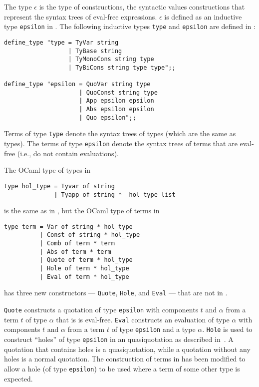 \documentclass[fleqn]{llncs}
\begin{document}
The {\churchqe} type $\epsilon$ is the type of constructions, the
syntactic values constructions that represent the syntax trees of
eval-free expressions.  $\epsilon$ is defined as an inductive type
\texttt{epsilon} in {\HLQE}.  The following inductive types
\texttt{type} and \texttt{epsilon} are defined in {\HLQE}:

\begin{lstlisting}
define_type "type = TyVar string
                  | TyBase string
                  | TyMonoCons string type
                  | TyBiCons string type type";;

define_type "epsilon = QuoVar string type 
                     | QuoConst string type
                     | App epsilon epsilon
                     | Abs epsilon epsilon
                     | Quo epsilon";;
\end{lstlisting}

Terms of type \texttt{type} denote the syntax trees of {\HLQE} types
(which are the same as {\HOL} types).  The terms of type
\texttt{epsilon} denote the syntax trees of {\HLQE} terms that are
eval-free (i.e., do not contain evaluations).  

The OCaml type of {\HOL} types in {\HLQE}

\begin{lstlisting}
type hol_type = Tyvar of string
              | Tyapp of string *  hol_type list
\end{lstlisting}

\noindent
is the same as in {\HL}, but the OCaml type of {\HOL} terms in {\HLQE}

\begin{lstlisting}
type term = Var of string * hol_type
          | Const of string * hol_type
          | Comb of term * term
          | Abs of term * term
          | Quote of term * hol_type
          | Hole of term * hol_type
          | Eval of term * hol_type
\end{lstlisting}

\noindent
has three new constructors --- \texttt{Quote}, \texttt{Hole}, and
\texttt{Eval} --- that are not in {\HL}.

\texttt{Quote} constructs a quotation of type \texttt{epsilon} with
components $t$ and $\alpha$ from a term $t$ of type $\alpha$ that is
is eval-free.  \texttt{Eval} constructs an evaluation of type $\alpha$
with components $t$ and $\alpha$ from a term $t$ of type
\texttt{epsilon} and a type $\alpha$.  \texttt{Hole} is used to
construct ``holes'' of type \texttt{epsilon} in an quasiquotation as
described in~\cite{FarmerArxiv16}.  A {\HLQE} quotation that contains
holes is a quasiquotation, while a quotation without any holes is a
normal quotation.  The construction of terms in {\HLQE} has been
modified to allow a hole (of type \texttt{epsilon}) to be used where a
term of some other type is expected.
\end{document}
